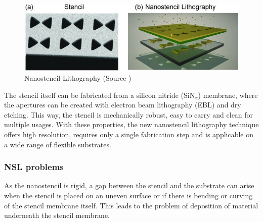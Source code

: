 \documentclass[journal, a4paper]{IEEEtran}
\begin{document}
\begin{figure}[hbt!]
\begin{center}
\includegraphics[width=\columnwidth]{04nsl.jpg}
\caption{Nanostencil Lithography (Source \cite{paper})}
\label{fig:nsl}
\end{center}
\end{figure}

The stencil itself can be fabricated from a silicon nitride (SiN$_x$) membrane, where the apertures can be created with electron beam lithography (EBL) and dry etching. This way, the stencil is mechanically robust, easy to carry and clean for multiple usages. With these properties, the new nanostencil lithography technique offers high resolution, requires only a single fabrication step and is applicable on a wide range of flexible substrates.

\subsubsection{NSL problems} 
As the nanostencil is rigid, a gap between the stencil and the substrate can arise when the stencil is placed on an uneven surface or if there is bending or curving of the stencil membrane itself. This leads to the problem of deposition of material underneath the stencil membrane. 
\end{document}
